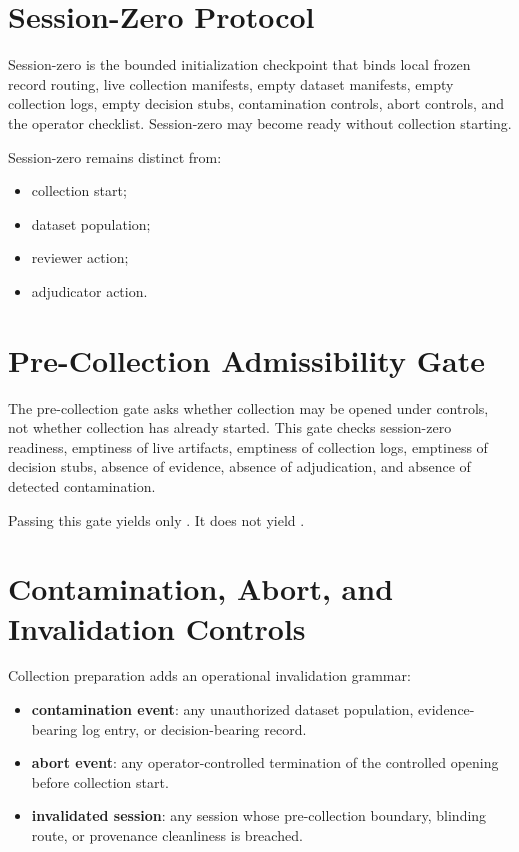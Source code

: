\documentclass[11pt,a4paper]{article}
\begin{document}
\section{Session-Zero Protocol}

Session-zero is the bounded initialization checkpoint that binds local frozen
record routing, live collection manifests, empty dataset manifests, empty
collection logs, empty decision stubs, contamination controls, abort controls,
and the operator checklist. Session-zero may become ready without collection
starting.

Session-zero remains distinct from:

\begin{itemize}
\item collection start;
\item dataset population;
\item reviewer action;
\item adjudicator action.
\end{itemize}

\section{Pre-Collection Admissibility Gate}

The pre-collection gate asks whether collection may be opened under controls,
not whether collection has already started. This gate checks session-zero
readiness, emptiness of live artifacts, emptiness of collection logs,
emptiness of decision stubs, absence of evidence, absence of adjudication, and
absence of detected contamination.

Passing this gate yields only \texttt{\allowbreak{}\allowbreak{}\allowbreak{}\allowbreak{}}.
It does not yield \texttt{\allowbreak{}\allowbreak{}}.

\section{Contamination, Abort, and Invalidation Controls}

Collection preparation adds an operational invalidation grammar:

\begin{itemize}
\item \textbf{contamination event}: any unauthorized dataset population, evidence-bearing log entry, or decision-bearing record.
\item \textbf{abort event}: any operator-controlled termination of the controlled opening before collection start.
\item \textbf{invalidated session}: any session whose pre-collection boundary, blinding route, or provenance cleanliness is breached.
\end{itemize}
\end{document}
